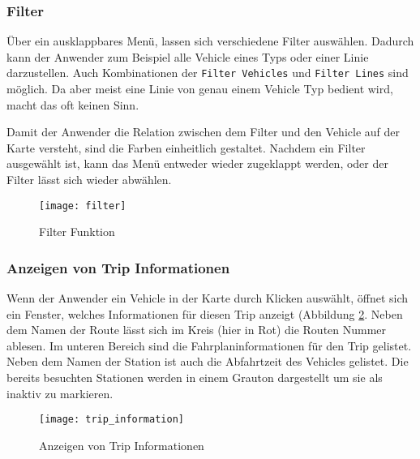 
    \subsubsection*{Filter}
    \label{ssub:filter}
      Über ein ausklappbares Menü, lassen sich verschiedene Filter auswählen. Dadurch kann der Anwender zum Beispiel alle Vehicle eines Typs oder einer Linie darzustellen. Auch Kombinationen der \texttt{Filter Vehicles} und \texttt{Filter Lines} sind möglich. Da aber meist eine Linie von genau einem Vehicle Typ bedient wird, macht das oft keinen Sinn.

      Damit der Anwender die Relation zwischen dem Filter und den Vehicle auf der Karte versteht, sind die Farben einheitlich gestaltet. Nachdem ein Filter ausgewählt ist, kann das Menü entweder wieder zugeklappt werden, oder der Filter lässt sich wieder abwählen.

      \begin{figure}[htbp]
        \begin{center}
          \texttt{[image: filter]}
          \caption{Filter Funktion}
          \label{fig:filter}
        \end{center}
      \end{figure}
      

    \subsubsection*{Anzeigen von Trip Informationen}
    \label{ssub:anzeigen_von_trip_informationen}
      Wenn der Anwender ein Vehicle in der Karte durch Klicken auswählt, öffnet sich ein Fenster, welches Informationen für diesen Trip anzeigt (Abbildung \ref{fig:trip_information}. Neben dem Namen der Route lässt sich im Kreis (hier in Rot) die Routen Nummer ablesen. Im unteren Bereich sind die Fahrplaninformationen für den Trip gelistet. Neben dem Namen der Station ist auch die Abfahrtzeit des Vehicles gelistet. Die bereits besuchten Stationen werden in einem Grauton dargestellt um sie als inaktiv zu markieren.


      \begin{figure}[htbp]
        \begin{center}
          \texttt{[image: trip\_information]}
          \caption{Anzeigen von Trip Informationen}
          \label{fig:trip_information}
        \end{center}
      \end{figure}

